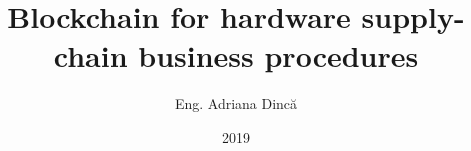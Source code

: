 \title{Blockchain for hardware supply-chain business procedures}
\author{Eng. Adriana Dincă}
\date{2019}



\newcommand{\project}{Hardware Supply-Chain}

